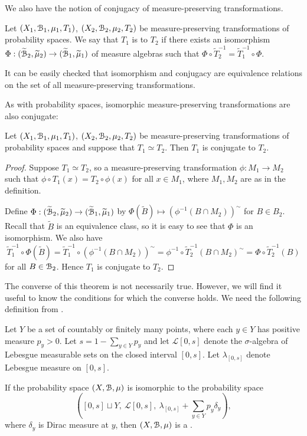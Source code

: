We also have the notion of conjugacy of measure-preserving transformations.

\begin{definition}
	Let $(X_1, \mathcal{B}_1, \mu_1, T_1)$, $(X_2, \mathcal{B}_2, \mu_2, T_2)$ be measure-preserving transformations of probability spaces. We say that $T_1$ is  to $T_2$ if there exists an isomorphism $\Phi : (\widetilde{\mathcal{B}}_2, \widetilde{\mu}_2) \to (\widetilde{\mathcal{B}}_1, \widetilde{\mu}_1)$ of measure algebras such that $\Phi \circ \tilde{T}_2^{-1} = \tilde{T}_1^{-1} \circ \Phi$.
\end{definition}

It can be easily checked that isomorphism and conjugacy are equivalence relations on the set of all measure-preserving transformations.

As with probability spaces, isomorphic measure-preserving transformations are also conjugate:

\begin{theorem}\label{thm:walters-2-5}
	Let $(X_1, \mathcal{B}_1, \mu_1, T_1)$, $(X_2, \mathcal{B}_2, \mu_2, T_2)$ be measure-preserving transformations of probability spaces and suppose that $T_1 \simeq T_2$. Then $T_1$ is conjugate to $T_2$.
	
	\begin{proof}
		Suppose $T_1 \simeq T_2$, so a measure-preserving transformation $\phi : M_1 \to M_2$ such that $\phi \circ T_1(x) = T_2 \circ \phi(x)$ for all $x \in M_1$, where $M_1, M_2$ are as in the definition.
		
		Define $\Phi : (\widetilde{\mathcal{B}}_2, \widetilde{\mu}_2) \to (\widetilde{\mathcal{B}}_1, \widetilde{\mu}_1)$ by $\Phi(\tilde{B}) \mapsto (\phi^{-1}(B \cap M_2))^\sim$ for $B \in B_2$. Recall that $\tilde{B}$ is an equivalence class, so it is easy to see that $\Phi$ is an isomorphism. We also have
		\[
			\tilde{T}_1^{-1} \circ \Phi(\tilde{B}) = \tilde{T}_1^{-1} \circ (\phi^{-1}(B \cap M_2))^\sim = \phi^{-1} \circ \tilde{T}_2^{-1} (B \cap M_2)^\sim = \Phi \circ \tilde{T}_2^{-1}(B)
		\]
		for all $B \in \mathcal{B}_2$. Hence $T_1$ is conjugate to $T_2$.
	\end{proof}
\end{theorem}

The converse of this theorem is not necessarily true. However, we will find it useful to know the conditions for which the converse holds. We need the following definition from \cite[Definition A.21]{einsiedler-ward:ergodic-nt}.

\begin{definition}
	Let $Y$ be a set of countably or finitely many points, where each $y \in Y$ has positive measure $p_y > 0$. Let $s = 1 - \sum_{y \in Y}{p_y}$ and let $\mathcal{L}[0, s]$ denote the $\sigma$-algebra of Lebesgue measurable sets on the closed interval $[0, s]$. Let $\lambda_{[0, s]}$ denote Lebesgue measure on $[0, s]$.
	
	If the probability space $(X, \mathcal{B}, \mu)$ is isomorphic to the probability space
	\[
		\left([0, s] \sqcup Y,\ \mathcal{L}[0, s],\ \lambda_{[0, s]} + \sum_{y \in Y}{p_y \delta_y} \right),
	\]
	where $\delta_y$ is Dirac measure at $y$, then $(X, \mathcal{B}, \mu)$ is a .
\end{definition}

